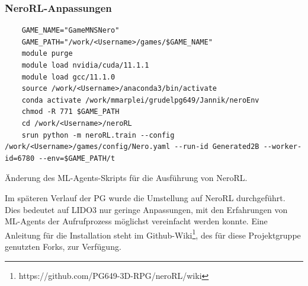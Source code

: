 \subsubsection{NeroRL-Anpassungen}
\begin{listing}
	\begin{verbatim}
	GAME_NAME="GameMNSNero"
	GAME_PATH="/work/<Username>/games/$GAME_NAME"
	module purge
	module load nvidia/cuda/11.1.1
	module load gcc/11.1.0
	source /work/<Username>/anaconda3/bin/activate
	conda activate /work/mmarplei/grudelpg649/Jannik/neroEnv
	chmod -R 771 $GAME_PATH
	cd /work/<Username>/neroRL  
	srun python -m neroRL.train --config /work/<Username>/games/config/Nero.yaml --run-id Generated2B --worker-id=6780 --env=$GAME_PATH/t
	\end{verbatim}
	\caption{Änderung des ML-Agents-Skripts für die Ausführung von NeroRL.}
	\label{prog:neroRlChanges}
\end{listing}
Im späteren Verlauf der PG wurde die Umstellung auf NeroRL durchgeführt. Dies bedeutet auf LIDO3 nur geringe Anpassungen, mit den Erfahrungen von ML-Agents der Aufrufprozess möglichst vereinfacht werden konnte. Eine Anleitung für die Installation steht im Github-Wiki\footnote{https://github.com/PG649-3D-RPG/neroRL/wiki}, des für diese Projektgruppe genutzten Forks, zur Verfügung.



